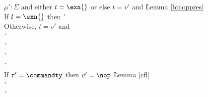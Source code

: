 \begin{description}
\begin{tabbing}
$\mu' : \Sigma$ and either $t = \exn{}$ or else $t = v'$ and 
  \` Lemma \ref{binoppres} \\
If $t = \exn{}$ then 
  \`  \\
Otherwise, $t = v'$ and  \\
  \`  \\
  \`  \\
  \`  \\
  \`  \\
If $\tau' = \commandty$ then $v' = \nop$
  \` Lemma \ref{cfl} \\
  \`  \\
  \`  \\

\end{tabbing}


\end{description}
